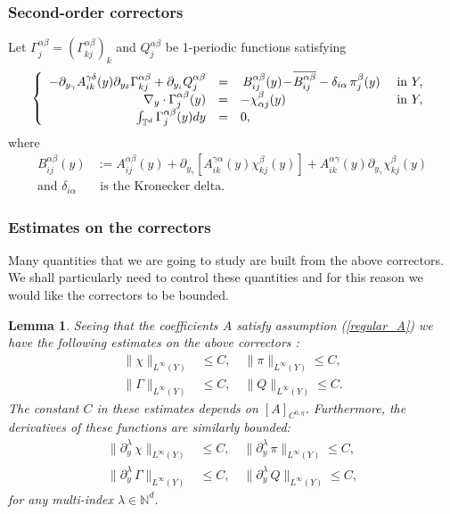 \documentclass[11pt, reqno]{amsart}
\newtheorem{lemma}[theorem]{Lemma}
\theoremstyle{definition}
\theoremstyle{remark}
\numberwithin{equation}{section}
\begin{document}
	\subsubsection{Second-order correctors}
	Let  $\Gamma^{\alpha\beta}_{j}=(\Gamma^{\alpha\beta}_{kj})_k$ and   $Q^{\alpha\beta}_{j}$ be 1-periodic functions satisfying 
	\begin{equation}\label{GamQ}
		\left\{
		\begin{array}{rcll}
			-\partial_{y_{\gamma}}A^{\gamma\delta}_{ik}(y) \partial_{ y_{\delta}}\Gamma^{\alpha\beta}_{kj}	+\partial_{y_i}Q^{\alpha\beta}_{j}
			&=& \, B^{\alpha\beta}_{ij}(y)\!-\!\overline{B^{\alpha\beta}_{ij}}  - \delta_{i\alpha} \, \pi^{\beta}_{j}(y)& \mbox{ in } Y,\\
			\nabla_y \cdot\Gamma^{\alpha\beta}_{j}(y)	&=&-  \chi^{\beta}_{\alpha j}(y) &  \mbox{ in } Y, \\
			\int_{\mathbb{T}^d} \Gamma^{\alpha\beta}_{j}(y) dy&=& 0,
		\end{array}
		\right. \\
	\end{equation}
	where
	\begin{align*}
		B^{\alpha\beta}_{ij}(y)&:= A^{\alpha\beta}_{ij}(y)\!+\!\partial_{y_{\gamma}}[A^{\gamma\alpha}_{ik}(y) \chi^{\beta}_{kj}(y)]\!+\! A^{\alpha\gamma}_{ik}(y) \partial_{y_{\gamma}} \chi^{\beta}_{kj}(y)\\
		\mbox{and } \delta_{i\alpha} & \mbox{  is the Kronecker delta}.
	\end{align*}
	
	
	\subsubsection{Estimates on the correctors} Many quantities that we are going to study are built from the above correctors. We shall particularly need to control these quantities and for this reason we would like the correctors to be bounded. 
	\begin{lemma}\label{bound_on_correctors}
		Seeing that the coefficients $A$ satisfy assumption \textup{(\ref{regular_A})} we have the following estimates on the above  correctors :
		\begin{align*}
		\|\chi \|_{L^\infty(Y)}&\leq C,\quad   \|\pi \|_{L^\infty(Y)}\leq C, \\
			\| \Gamma \|_{L^\infty(Y)}&\leq C,\quad\| Q\|_{L^\infty(Y)}\leq C.
		\end{align*}
		The constant $C$ in these estimates depends on $[A]_{C^{0,\eta}}$. Furthermore, the derivatives of these functions are similarly bounded:
			\begin{align*}
			\| \partial^\lambda_y \,\chi \|_{L^\infty(Y)}&\leq C,\quad   \|  \partial^\lambda_y \,\pi \|_{L^\infty(Y)}\leq C, \\
			\|\partial^\lambda_y \, \Gamma \|_{L^\infty(Y)}&\leq C,\quad\|\partial^\lambda_y \, Q\|_{L^\infty(Y)}\leq C,
		\end{align*}
		for any multi-index $\lambda\in\mathbb{N}^d$.
		
	\end{lemma}
	
\end{document}
